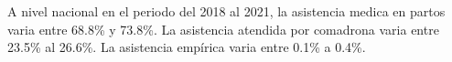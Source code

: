 A nivel nacional en el periodo del 2018 al 2021, la asistencia medica en partos varia entre 68.8\% y 73.8\%. La asistencia atendida por comadrona varia entre 23.5\% al 26.6\%. La asistencia empírica varia entre 0.1\% a 0.4\%. 